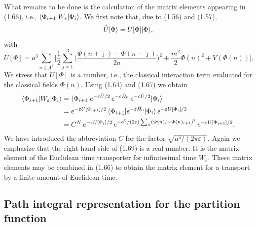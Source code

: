 What remains to be done is the calculation of the matrix elements appearing
in (1.66), i.e., $\langle\Phi_{i+1}|W_\varepsilon|\Phi_i\rangle$. We first note
that, due to (1.56) and (1.57),
\begin{equation}
  \hat{U}|\Phi\rangle = U[\Phi]|\Phi\rangle,
\end{equation}
with
\begin{equation}
  U[\Phi] = a^3\sum_{n\in\Lambda^3}\Big[
    \frac{1}{2}\sum_{j=1}^3
      \Big(\frac{\Phi(n+\hat{\jmath}) - \Phi(n-\hat{\jmath})}{2a}\Big)^2
    + \frac{m^2}{2}\Phi(n)^2 + V(\Phi(n))\Big].
\end{equation}
We stress that $U[\Phi]$ is a number, i.e., the classical interaction term
evaluated for the classical fields $\Phi(n)$. Using (1.64) and (1.67) we obtain
\begin{align}
  \langle\Phi_{i+1}|W_\varepsilon|\Phi_i\rangle
  &= \langle\Phi_{i+1}|e^{-\varepsilon\hat{U}/2}\,e^{-\varepsilon\hat{H}_0}\,
     e^{-\varepsilon\hat{U}/2}|\Phi_i\rangle \notag\\
  &= e^{-\varepsilon U[\Phi_{i+1}]/2}\,
     \langle\Phi_{i+1}|e^{-\varepsilon\hat{H}_0}|\Phi_i\rangle\,
     e^{-\varepsilon U[\Phi_i]/2} \notag\\
  &= C^N\,e^{-\varepsilon U[\Phi_i]/2}\,
     e^{-a^3/(2\varepsilon)\sum_n(\Phi(n)_i - \Phi(n)_{i+1})^2}\,
     e^{-\varepsilon U[\Phi_{i+1}]/2}.
\end{align}
We have introduced the abbreviation $C$ for the factor $\sqrt{a^3/(2\pi
\varepsilon)}$. Again we emphasize that the right-hand side of (1.69) is a real
number. It is the matrix element of the Euclidean time transporter for
infinitesimal time $W_\varepsilon$. These matrix elements may be combined in
(1.66) to obtain the matrix element for a transport by a finite amount of
Euclidean time.

\subsection{Path integral representation for the partition function}

